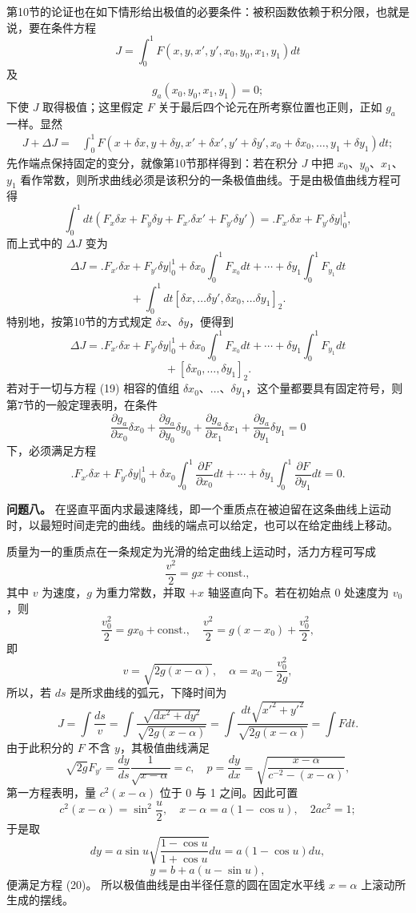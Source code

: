 \documentclass[11pt,a4paper,leqno]{article}
\begin{document}
第10节的论证也在如下情形给出极值的必要条件：被积函数依赖于积分限，也就是说，要在条件方程
\[
J=\int_0^1 F(x,y,x',y',x_0,y_0,x_1,y_1)dt
\]
及
\begin{equation}\tag{19}
g_a(x_0,y_0,x_1,y_1)=0;
\end{equation}
下使 $J$ 取得极值；这里假定 $F$ 关于最后四个论元在所考察位置也正则，正如 $g_a$ 一样。显然
\[
\begin{split}
J+\Delta J
={}&\int_0^1 F(x+\delta x,y+\delta y,x'+\delta x',y'+\delta y',x_0+\delta x_0,\ldots,y_1+\delta y_1)dt;
\end{split}
\]
先作端点保持固定的变分，就像第10节那样得到：若在积分 $J$ 中把 $x_0$、$y_0$、$x_1$、$y_1$ 看作常数，则所求曲线必须是该积分的一条极值曲线。于是由极值曲线方程可得
\[
\int_0^1 dt(F_x\delta x+F_y\delta y+F_{x'}\delta x'+F_{y'}\delta y')=\bigl. F_{x'}\delta x+F_{y'}\delta y\bigr|_0^1,
\]
而上式中的 $\Delta J$ 变为
\[
\Delta J=\bigl. F_{x'}\delta x+F_{y'}\delta y\bigr|_0^1+\delta x_0\int_0^1 F_{x_0}dt+\cdots+\delta y_1\int_0^1 F_{y_1}dt
\]
\[
{}+\int_0^1dt[\delta x,\ldots \delta y',\delta x_0,\ldots \delta y_1]_2.
\]
特别地，按第10节的方式规定 $\delta x$、$\delta y$，便得到
\[
\Delta J=\bigl. F_{x'}\delta x+F_{y'}\delta y\bigr|_0^1+\delta x_0\int_0^1 F_{x_0}dt+\cdots+\delta y_1\int_0^1 F_{y_1}dt
\]
\[
{}+[\delta x_0,\ldots,\delta y_1]_2.
\]
若对于一切与方程 (19) 相容的值组 $\delta x_0$、$\ldots$、$\delta y_1$，这个量都要具有固定符号，则第7节的一般定理表明，在条件
\[
\frac{\partial g_a}{\partial x_0}\delta x_0+\frac{\partial g_a}{\partial y_0}\delta y_0+\frac{\partial g_a}{\partial x_1}\delta x_1+\frac{\partial g_a}{\partial y_1}\delta y_1=0
\]
下，必须满足方程
\[
\bigl. F_{x'}\delta x+F_{y'}\delta y\bigr|_0^1+\delta x_0\int_0^1 \frac{\partial F}{\partial x_0}dt+\cdots+\delta y_1\int_0^1 \frac{\partial F}{\partial y_1}dt=0.
\]

\medskip
\noindent\textbf{问题八。} 在竖直平面内求最速降线，即一个重质点在被迫留在这条曲线上运动时，以最短时间走完的曲线。曲线的端点可以给定，也可以在给定曲线上移动。

质量为一的重质点在一条规定为光滑的给定曲线上运动时，活力方程可写成
\[
\frac{v^2}{2}=gx+\mathrm{const.},
\]
其中 $v$ 为速度，$g$ 为重力常数，并取 $+x$ 轴竖直向下。若在初始点 0 处速度为 $v_0$，则
\[
\frac{v_0^2}{2}=gx_0+\mathrm{const.},\quad \frac{v^2}{2}=g(x-x_0)+\frac{v_0^2}{2},
\]
即
\[
v=\sqrt{2g(x-\alpha)},\quad \alpha=x_0-\frac{v_0^2}{2g},
\]
所以，若 $ds$ 是所求曲线的弧元，下降时间为
\[
J=\int\frac{ds}{v}=\int\frac{\sqrt{dx^2+dy^2}}{\sqrt{2g(x-\alpha)}}=\int\frac{dt\sqrt{x'^2+y'^2}}{\sqrt{2g(x-\alpha)}}=\int Fdt.
\]
由于此积分的 $F$ 不含 $y$，其极值曲线满足
\begin{equation}\tag{20}
\sqrt{2g}F_{y'}=\frac{dy}{ds}\frac{1}{\sqrt{x-\alpha}}=c,\quad
p=\frac{dy}{dx}=\sqrt{\frac{x-\alpha}{c^{-2}-(x-\alpha)}},
\end{equation}
第一方程表明，量 $c^2(x-\alpha)$ 位于 0 与 1 之间。因此可置
\[
c^2(x-\alpha)=\sin^2\frac{u}{2},\quad x-\alpha=a(1-\cos u),\quad 2ac^2=1;
\]
于是取
\[
dy=a\sin u\sqrt{\frac{1-\cos u}{1+\cos u}}du=a(1-\cos u)du,
\]
\[
y=b+a(u-\sin u),
\]
便满足方程 (20)。
所以极值曲线是由半径任意的圆在固定水平线 $x=\alpha$ 上滚动所生成的摆线。
\end{document}
